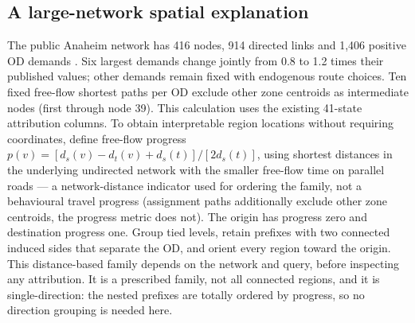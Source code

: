\subsection{A large-network spatial explanation}\label{sec:anaheim}
The public Anaheim network has 416 nodes, 914 directed links and 1,406 positive OD demands \citep{tnfrc2024transportation}. Six largest demands change jointly from 0.8 to 1.2 times their published values; other demands remain fixed with endogenous route choices. Ten fixed free-flow shortest paths per OD exclude other zone centroids as intermediate nodes (first through node 39). This calculation uses the existing 41-state attribution columns.
To obtain interpretable region locations without requiring coordinates, define free-flow progress $p(v)=[d_s(v)-d_t(v)+d_s(t)]/[2d_s(t)]$, using shortest distances in the underlying undirected network with the smaller free-flow time on parallel roads --- a network-distance indicator used for ordering the family, not a behavioural travel progress (assignment paths additionally exclude other zone centroids, the progress metric does not). The origin has progress zero and destination progress one. Group tied levels, retain prefixes with two connected induced sides that separate the OD, and orient every region toward the origin. This distance-based family depends on the network and query, before inspecting any attribution. It is a prescribed family, not all connected regions, and it is single-direction: the nested prefixes are totally ordered by progress, so no direction grouping is needed here.

